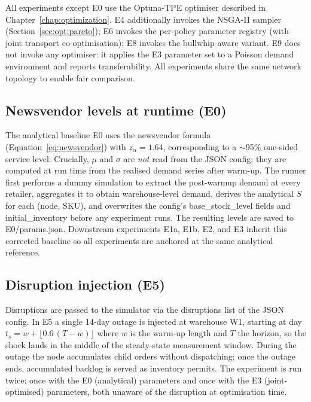All experiments except E0 use the Optuna-TPE optimiser described in
Chapter~\ref{chap:optimization}.  E4 additionally invokes the
NSGA-II sampler (Section~\ref{sec:opt:pareto}); E6 invokes the
per-policy parameter registry (with joint transport co-optimisation); E8 invokes the bullwhip-aware variant.
E9 does not invoke any optimiser: it applies the E3 parameter set to a Poisson demand
environment and reports transferability.
All experiments share the same network topology to enable fair comparison.

\subsection{Newsvendor levels at runtime (E0)}
\label{sec:meth:newsvendor-runtime}

The analytical baseline E0 uses the newsvendor formula
(Equation~\ref{eq:newsvendor}) with $z_\alpha = 1.64$,
corresponding to a $\sim$95\% one-sided service level.  Crucially, $\mu$ and $\sigma$ are
\emph{not} read from the JSON config; they are computed at run time
from the realised demand series after warm-up.  The runner first
performs a dummy simulation to extract the post-warmup demand at every
retailer, aggregates it to obtain warehouse-level demand, derives the
analytical $S$ for each (node, SKU), and overwrites the config's
base\_stock\_level fields and initial\_inventory
before any experiment runs.  The resulting levels are saved to
E0/params.json.  Downstream experiments E1a, E1b, E2, and E3
inherit this corrected baseline so all experiments are anchored at the
same analytical reference.

\subsection{Disruption injection (E5)}
\label{sec:meth:disruption-injection}

Disruptions are passed to the simulator via the disruptions
list of the JSON config.  In E5 a single 14-day outage is injected at
warehouse W1, starting at day $t_s = w + \lfloor 0.6\,(T-w) \rfloor$
where $w$ is the warm-up length and $T$ the horizon, so the shock lands
in the middle of the steady-state measurement window.  During the
outage the node accumulates child orders without dispatching; once the
outage ends, accumulated backlog is served as inventory permits.  The
experiment is run twice: once with the E0 (analytical) parameters and
once with the E3 (joint-optimised) parameters, both unaware of the
disruption at optimisation time.

